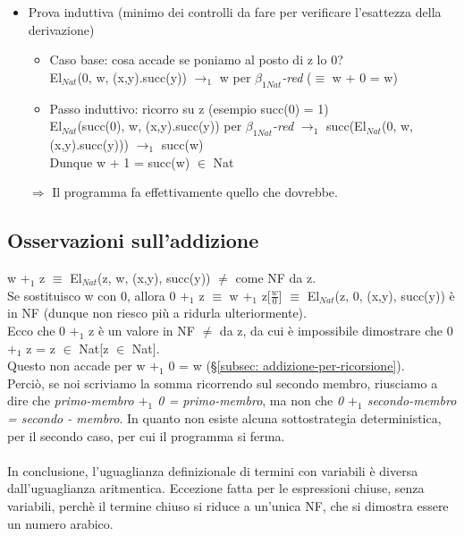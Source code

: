 \noindent
\normalsize
\begin{itemize}
\item Prova induttiva (minimo dei controlli da fare per verificare l'esattezza della derivazione)
\begin{itemize}
\item Caso base: cosa accade se poniamo al posto di z lo 0?\\
El$_{Nat}$(0, w, (x,y).succ(y)) $\rightarrow_1$ w per \textit{$\beta_{1Nat}$-red} ($\equiv$ w + 0 = w)
\item Passo induttivo: ricorro su z (esempio succ(0) = 1)\\
El$_{Nat}$(succ(0), w, (x,y).succ(y)) per \textit{$\beta_{1Nat}$-red} $\rightarrow_1$ succ(El$_{Nat}$(0, w, (x,y).succ(y))) $\rightarrow_1$ succ(w) \\
Dunque w + 1 = succ(w) $\in$ Nat
\end{itemize}
\noindent
$\Rightarrow$ Il programma fa effettivamente quello che dovrebbe.
\end{itemize}

\subsection{Osservazioni sull'addizione}
\label{subsubsec: osservazioni-addizione}
w $+_1$ z $\equiv$ El$_{Nat}$(z, w, (x,y), succ(y)) $\neq$ come NF da z.\\
Se sostituisco w con 0, allora 0 $+_1$ z $\equiv$ w $+_1$ z[$\frac{w}{0}$] $\equiv$ El$_{Nat}$(z, 0, (x,y), succ(y)) \`e in NF (dunque non riesco pi\`u a ridurla ulteriormente). 
\\Ecco che 0 $+_1$ z \`e un valore in NF $\neq$ da z, da cui \`e impossibile dimostrare che 0 $+_1$ z = z $\in$ Nat[z $\in$ Nat].\\
Questo non accade per w $+_1$ 0 = w (\S \ref{subsec: addizione-per-ricorsione}).\\ 
Perci\`o, se noi scriviamo la somma ricorrendo sul secondo membro, riusciamo a dire che \textit{primo-membro $+_1$ 0 = primo-membro}, ma non che \textit{0 $+_1$ secondo-membro = secondo - membro}. In quanto non esiste alcuna sottostrategia deterministica, per il secondo caso, per cui il programma si ferma.
\\\\
In conclusione, l'uguaglianza definizionale di termini con variabili \`e diversa dall'uguaglianza aritmentica. Eccezione fatta per le espressioni chiuse, senza variabili, perch\`e il termine chiuso si riduce a un'unica NF, che si dimostra essere un numero arabico.

